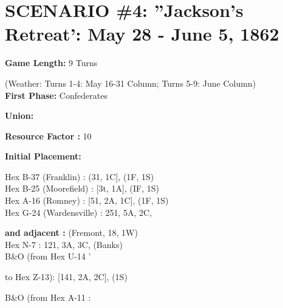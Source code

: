 \section{SCENARIO \#4: ''Jackson's Retreat': May 28 - June 5, 1862
}


\begin{scenariodata}
\textbf{Game Length:} 9 Turns\\
\end{scenariodata}

\begin{scenariodata}
(Weather: Turns 1-4: May 16-31 Column; Turns 5-9: June Column)\\
\textbf{First Phase:} Confederates\\
\end{scenariodata}

\begin{scenariodata}
\textbf{Union:}\\
\end{scenariodata}

\begin{scenariodata}
\textbf{Resource Factor :} 10\\
\end{scenariodata}

\begin{scenariodata}
\textbf{Initial Placement:}\\
\end{scenariodata}

\begin{scenariodata}
Hex B-37 (Franklin) : (31, 1C], (1F, 1S)\\
Hex B-25 (Moorefield) : [3t, 1A], (IF, 1S)\\
Hex A-16 (Romney) : [51, 2A, 1C], (1F, 1S)\\
Hex G-24 (Wardensville) : 251, 5A, 2C,\\
\end{scenariodata}

\begin{scenariodata}
\textbf{and adjacent :} (Fremont, 18, 1W)\\
Hex N-7 : 121, 3A, 3C, (Banks)\\
B\&O (from Hex U-14 '\\
\end{scenariodata}

to Hex Z-13): [141, 2A, 2C], (1S)

\begin{scenariodata}
B\&O (from Hex A-11 :\\
\end{scenariodata}

